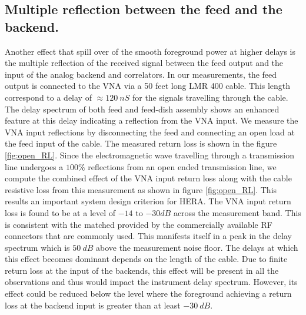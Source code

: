 \documentclass[twocolumn]{emulateapj}
\begin{document}
\subsection{Multiple reflection between the feed and the backend.}
Another effect that spill over of the smooth foreground power at higher delays is the multiple reflection of the received signal between the feed output and the input of the analog backend and correlators. In our measurements, the feed output is connected to the VNA via a 50 feet long LMR 400 cable. This length correspond to a delay of $\approx 120~nS$ for the signals travelling through the cable. The delay spectrum of both feed and feed-dish assembly shows an enhanced feature at this delay indicating a reflection from the VNA input. We measure the VNA input reflections by disconnecting the feed and connecting an open load at the feed input of the cable. The measured return loss is shown in the figure \ref{fig:open_RL}. Since the electromagnetic wave travelling through a transmission line undergoes a $100\%$ reflections from an open ended transmission line, we compute the combined effect of the VNA input return loss along with the cable resistive loss from this measurement as shown in figure \ref{fig:open_RL}. This results an important system design criterion for HERA. The VNA input return loss is found to be at a level of $-14$ to $-30dB$ across the measurement band. This is consistent with the matched provided by the commercially available RF connectors that are commonly used. This manifests itself in a peak in the delay spectrum which is $50~dB$ above the measurement noise floor. The delays at which this effect becomes dominant depends on the length of the cable. Due to finite return loss at the input of the backends, this effect will be present in all the observations and thus would impact the instrument delay spectrum. However, its effect could be reduced below the level where the foreground  achieving a return loss at the backend input is greater than at least $-30~dB$. 
\end{document}
